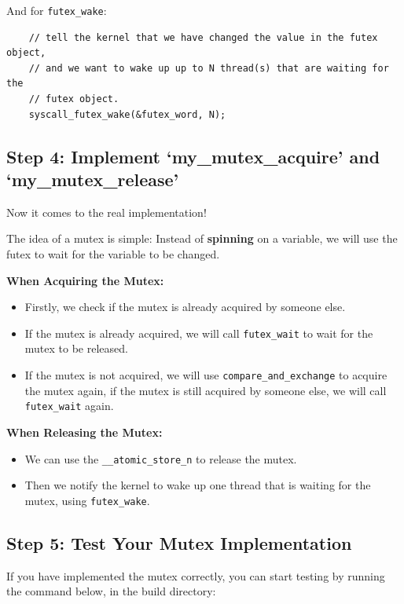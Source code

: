 And for \texttt{futex\_wake}:

\begin{verbatim}
    // tell the kernel that we have changed the value in the futex object,
    // and we want to wake up up to N thread(s) that are waiting for the
    // futex object.
    syscall_futex_wake(&futex_word, N);
\end{verbatim}

\subsection{Step 4: Implement `my\_mutex\_acquire' and `my\_mutex\_release'}

Now it comes to the real implementation!

The idea of a mutex is simple: Instead of \textbf{spinning} on a variable, we
will use the futex to wait for the variable to be changed.

\textbf{When Acquiring the Mutex:}

\begin{itemize}
    \item Firstly, we check if the mutex is already acquired by someone else.
    \item If the mutex is already acquired, we will call \texttt{futex\_wait} to
          wait for the mutex to be released.
    \item If the mutex is not acquired, we will use \texttt{compare\_and\_exchange}
          to acquire the mutex again, if the mutex is still acquired by someone
          else, we will call \texttt{futex\_wait} again.
\end{itemize}

\textbf{When Releasing the Mutex:}

\begin{itemize}
    \item We can use the \texttt{\_\_atomic\_store\_n} to release the mutex.
    \item Then we notify the kernel to wake up one thread that is waiting for the
          mutex, using \texttt{futex\_wake}.
\end{itemize}

\subsection{Step 5: Test Your Mutex Implementation}

If you have implemented the mutex correctly, you can start testing by running the command
below, in the build directory:

